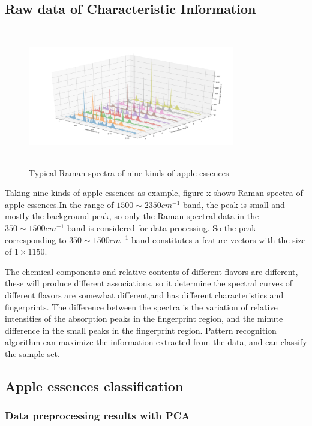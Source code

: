 \documentclass[a4paper]{article}
\begin{document}
\subsection{Raw data of Characteristic Information}
\begin{figure}[h]
  \centering
  \includegraphics[width=9cm,height=6cm]{Typical_Raman_spectra}
  \caption{Typical Raman spectra of nine kinds of apple essences}
\end{figure}
Taking nine kinds of apple essences as example, figure x shows Raman spectra of apple essences.In the range of $1500 \sim 2350cm^{-1}$ band, the peak is small and mostly the background peak, so only the Raman spectral data in the $350 \sim 1500cm^{-1}$ band is considered for data processing. So the peak corresponding to $350 \sim 1500cm^{-1}$ band constitutes a feature vectors with the size of $ 1\times 1150 $.

The chemical components and relative contents of different flavors are different, these will produce different associations, so it  determine the spectral curves of different flavors are somewhat different,and has different  characteristics and fingerprints. The difference between the spectra is the variation of relative intensities of the absorption peaks in the fingerprint region, and the minute difference in the small peaks in the fingerprint region. Pattern recognition algorithm can maximize the information extracted from the data, and can classify the sample set.


\subsection{Apple essences classification}
    \subsubsection{Data preprocessing results with PCA}
\end{document}
